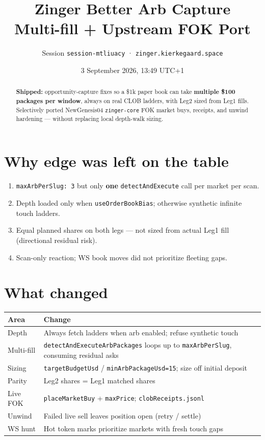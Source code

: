 \documentclass[11pt,a4paper]{article}
\title{\textbf{Zinger Better Arb Capture}\\[0.3em]
\large Multi-fill + Upstream FOK Port}
\author{Session \texttt{session-mtliuacy} · \texttt{zinger.kierkegaard.space}}
\date{3 September 2026, 13:49 UTC+1}
\begin{document}
\maketitle
\thispagestyle{empty}

\begin{abstract}
\noindent
\textbf{Shipped:} opportunity-capture fixes so a \$1k paper book can take \textbf{multiple \~\$100 packages per window}, always on real CLOB ladders, with Leg2 sized from Leg1 fills. Selectively ported NewGenesis04 \texttt{zinger-core} FOK market buys, receipts, and unwind hardening --- without replacing local depth-walk sizing.
\end{abstract}

\tableofcontents
\newpage

\section{Why edge was left on the table}
\begin{enumerate}[noitemsep]
  \item \texttt{maxArbPerSlug: 3} but only \textbf{one} \texttt{detectAndExecute} call per market per scan.
  \item Depth loaded only when \texttt{useOrderBookBias}; otherwise synthetic infinite touch ladders.
  \item Equal planned shares on both legs --- not sized from actual Leg1 fill (directional residual risk).
  \item Scan-only reaction; WS book moves did not prioritize fleeting gaps.
\end{enumerate}

\section{What changed}
\begin{table}[h]
\centering
\begin{tabular}{@{}lp{9cm}@{}}
\toprule
\textbf{Area} & \textbf{Change} \\
\midrule
Depth & Always fetch ladders when arb enabled; refuse synthetic touch \\
Multi-fill & \texttt{detectAndExecuteArbPackages} loops up to \texttt{maxArbPerSlug}, consuming residual asks \\
Sizing & \texttt{targetBudgetUsd} / \texttt{minArbPackageUsd=15}; size off initial deposit \\
Parity & Leg2 shares = Leg1 matched shares \\
Live FOK & \texttt{placeMarketBuy} + \texttt{maxPrice}; \texttt{clobReceipts.jsonl} \\
Unwind & Failed live sell leaves position open (retry / settle) \\
WS hunt & Hot token marks prioritize markets with fresh touch gaps \\
\bottomrule
\end{tabular}
\end{table}
\end{document}
